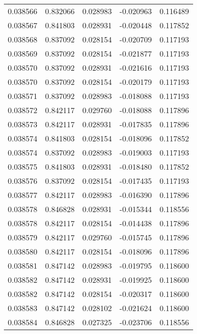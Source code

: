 \begin{tabular}{lrrrr}
0.038566    &  0.832066 &  0.028983 & -0.020963 &             0.116489 \\
0.038567    &  0.841803 &  0.028931 & -0.020448 &             0.117852 \\
0.038568    &  0.837092 &  0.028154 & -0.020709 &             0.117193 \\
0.038569    &  0.837092 &  0.028154 & -0.021877 &             0.117193 \\
0.038570    &  0.837092 &  0.028931 & -0.021616 &             0.117193 \\
0.038570    &  0.837092 &  0.028154 & -0.020179 &             0.117193 \\
0.038571    &  0.837092 &  0.028983 & -0.018088 &             0.117193 \\
0.038572    &  0.842117 &  0.029760 & -0.018088 &             0.117896 \\
0.038573    &  0.842117 &  0.028931 & -0.017835 &             0.117896 \\
0.038574    &  0.841803 &  0.028154 & -0.018096 &             0.117852 \\
0.038574    &  0.837092 &  0.028983 & -0.019003 &             0.117193 \\
0.038575    &  0.841803 &  0.028931 & -0.018480 &             0.117852 \\
0.038576    &  0.837092 &  0.028154 & -0.017435 &             0.117193 \\
0.038577    &  0.842117 &  0.028983 & -0.016390 &             0.117896 \\
0.038578    &  0.846828 &  0.028931 & -0.015344 &             0.118556 \\
0.038578    &  0.842117 &  0.028154 & -0.014438 &             0.117896 \\
0.038579    &  0.842117 &  0.029760 & -0.015745 &             0.117896 \\
0.038580    &  0.842117 &  0.028154 & -0.018096 &             0.117896 \\
0.038581    &  0.847142 &  0.028983 & -0.019795 &             0.118600 \\
0.038582    &  0.847142 &  0.028931 & -0.019925 &             0.118600 \\
0.038582    &  0.847142 &  0.028154 & -0.020317 &             0.118600 \\
0.038583    &  0.847142 &  0.028102 & -0.021624 &             0.118600 \\
0.038584    &  0.846828 &  0.027325 & -0.023706 &             0.118556 \\

\end{tabular}
